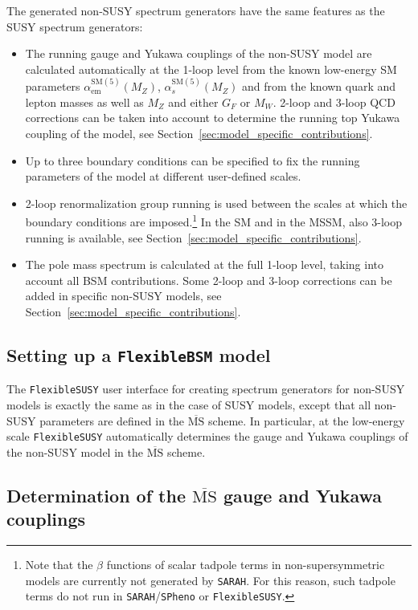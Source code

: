 \documentclass[final,3p,11pt,pdflatex]{elsarticle}
\makeatletter
\newcommand{\sarah}{\texttt{SARAH}\@\xspace}
\newcommand{\spheno}{\texttt{SPheno}\@\xspace}
\newcommand{\fs}{\texttt{FlexibleSUSY}\@\xspace}
\newcommand{\fbsm}{\texttt{FlexibleBSM}\@\xspace}
\newcommand{\ol}[1]{\overline{#1}}
\newcommand{\MSbar}{\ensuremath{\ol{\text{MS}}}\xspace}
\newcommand{\SM}{\ensuremath{\text{SM}}\xspace}
\newcommand{\secref}[1]{Section~\ref{#1}}
\def\as{\alpha_s}
\def\aem{\alpha_{\text{em}}}
\makeatother
\begin{document}
The generated non-SUSY spectrum generators have the same features as the SUSY
spectrum generators:
%
\begin{itemize}
\item The running gauge and Yukawa couplings of the non-SUSY model are
  calculated automatically at the 1-loop level from the known
  low-energy SM parameters
  $\aem^{\SM(5)}(M_Z)$, $\as^{\SM(5)}(M_Z)$
  and from the known quark and lepton masses as well as $M_Z$ and either $G_F$
  or $M_W$.  2-loop and 3-loop QCD corrections can be taken into
  account to determine the running top Yukawa coupling of the model,
  see \secref{sec:model_specific_contributions}.
\item Up to three boundary conditions can be specified to fix the
  running parameters of the model at different user-defined scales.
\item 2-loop renormalization group running is used between the scales
  at which the boundary conditions are imposed.\footnote{Note that
    the $\beta$ functions of scalar tadpole terms in
    non-supersymmetric models \cite{Goodsell:2012fm} are currently not
    generated by \sarah.  For this reason, such tadpole terms do not
    run in \sarah/\spheno or \fs.} In the SM and in the MSSM, also
  3-loop running is available, see
  \secref{sec:model_specific_contributions}.
\item The pole mass spectrum is calculated at the full 1-loop level,
  taking into account all BSM contributions.  Some 2-loop and 3-loop
  corrections can be added in specific non-SUSY models, see
  \secref{sec:model_specific_contributions}.
\end{itemize}

\subsection{Setting up a \fbsm model}

The \fs user interface for creating spectrum generators for non-SUSY
models is exactly the same as in the case of SUSY models, except that
all non-SUSY parameters are defined in the \MSbar scheme.  In
particular, at the low-energy scale \fs automatically determines
the gauge and Yukawa couplings of the non-SUSY model in the \MSbar
scheme.

\subsection{Determination of the \MSbar gauge and Yukawa couplings}
\label{sec:determination_of_g_Y}
\end{document}
